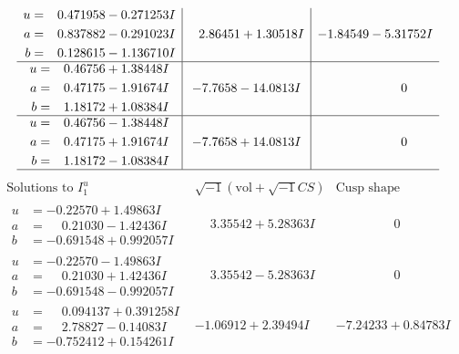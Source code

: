 \documentclass[1p]{elsarticle_modified}
\theoremstyle{definition}
\newcommand{\I}{\sqrt{-1}}
\begin{document}
$$\begin{array}{c|c|c}
\begin{aligned}
u &= \phantom{-}0.471958 - 0.271253 I \\
a &= \phantom{-}0.837882 - 0.291023 I \\
b &= \phantom{-}0.128615 - 1.136710 I\end{aligned}
 & \phantom{-}2.86451 + 1.30518 I & -1.84549 - 5.31752 I \\ \hline\begin{aligned}
u &= \phantom{-}0.46756 + 1.38448 I \\
a &= \phantom{-}0.47175 - 1.91674 I \\
b &= \phantom{-}1.18172 + 1.08384 I\end{aligned}
 & -7.7658 - 14.0813 I & \phantom{-0.000000 } 0 \\ \hline\begin{aligned}
u &= \phantom{-}0.46756 - 1.38448 I \\
a &= \phantom{-}0.47175 + 1.91674 I \\
b &= \phantom{-}1.18172 - 1.08384 I\end{aligned}
 & -7.7658 + 14.0813 I & \phantom{-0.000000 } 0\\
 \hline 
 \end{array}$$\newpage$$\begin{array}{c|c|c}  
\text{Solutions to }I^u_{1}& \I (\text{vol} + \sqrt{-1}CS) & \text{Cusp shape}\\
 \hline 
\begin{aligned}
u &= -0.22570 + 1.49863 I \\
a &= \phantom{-}0.21030 - 1.42436 I \\
b &= -0.691548 + 0.992057 I\end{aligned}
 & \phantom{-}3.35542 + 5.28363 I & \phantom{-0.000000 } 0 \\ \hline\begin{aligned}
u &= -0.22570 - 1.49863 I \\
a &= \phantom{-}0.21030 + 1.42436 I \\
b &= -0.691548 - 0.992057 I\end{aligned}
 & \phantom{-}3.35542 - 5.28363 I & \phantom{-0.000000 } 0 \\ \hline\begin{aligned}
u &= \phantom{-}0.094137 + 0.391258 I \\
a &= \phantom{-}2.78827 - 0.14083 I \\
b &= -0.752412 + 0.154261 I\end{aligned}
 & -1.06912 + 2.39494 I & -7.24233 + 0.84783 I \\ \hline\begin{aligned}

\end{aligned}
\end{array}$$
\end{document}
